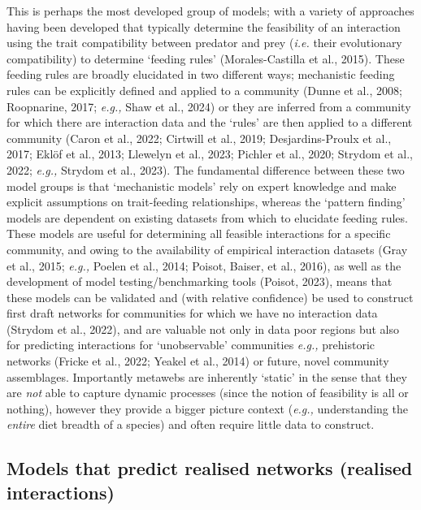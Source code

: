 \documentclass[
]{article}
\begin{document}
This is perhaps the most developed group of models; with a variety of
approaches having been developed that typically determine the
feasibility of an interaction using the trait compatibility between
predator and prey (\emph{i.e.} their evolutionary compatibility) to
determine `feeding rules' (Morales-Castilla et al., 2015). These feeding
rules are broadly elucidated in two different ways; mechanistic feeding
rules can be explicitly defined and applied to a community (Dunne et
al., 2008; Roopnarine, 2017; \emph{e.g.,} Shaw et al., 2024) or they are
inferred from a community for which there are interaction data and the
`rules' are then applied to a different community (Caron et al., 2022;
Cirtwill et al., 2019; Desjardins-Proulx et al., 2017; Eklöf et al.,
2013; Llewelyn et al., 2023; Pichler et al., 2020; Strydom et al., 2022;
\emph{e.g.,} Strydom et al., 2023). The fundamental difference between
these two model groups is that `mechanistic models' rely on expert
knowledge and make explicit assumptions on trait-feeding relationships,
whereas the `pattern finding' models are dependent on existing datasets
from which to elucidate feeding rules. These models are useful for
determining all feasible interactions for a specific community, and
owing to the availability of empirical interaction datasets (Gray et
al., 2015; \emph{e.g.,} Poelen et al., 2014; Poisot, Baiser, et al.,
2016), as well as the development of model testing/benchmarking tools
(Poisot, 2023), means that these models can be validated and (with
relative confidence) be used to construct first draft networks for
communities for which we have no interaction data (Strydom et al.,
2022), and are valuable not only in data poor regions but also for
predicting interactions for `unobservable' communities \emph{e.g.,}
prehistoric networks (Fricke et al., 2022; Yeakel et al., 2014) or
future, novel community assemblages. Importantly metawebs are inherently
`static' in the sense that they are \emph{not} able to capture dynamic
processes (since the notion of feasibility is all or nothing), however
they provide a bigger picture context (\emph{e.g.,} understanding the
\emph{entire} diet breadth of a species) and often require little data
to construct.

\subsection{Models that predict realised networks (realised
interactions)}\label{models-that-predict-realised-networks-realised-interactions}
\end{document}
